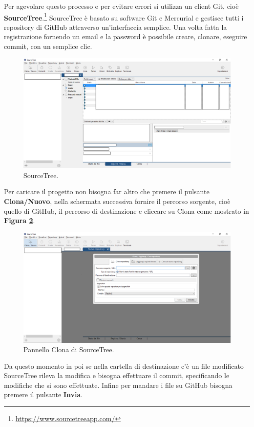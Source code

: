 \documentclass[a4paper,11pt]{article}
\begin{document}
Per agevolare questo processo e per evitare errori si utilizza un client Git, cioè \textbf{SourceTree}.\footnote{\url{https://www.sourcetreeapp.com/}}
SourceTree è basato su software Git e Mercurial e gestisce tutti i repository di GitHub attraverso un'interfaccia semplice.
Una volta fatta la registrazione fornendo un email e la password è 
possibile creare, clonare, eseguire commit, con un semplice clic.
\begin{figure}[!htpb]
	\centering
	\includegraphics[scale=0.30]{sourcetree.png}
	\caption{SourceTree.}
	\label{fig:14}
\end{figure}
Per caricare il progetto non bisogna far altro che premere il pulsante \textbf{Clona/Nuovo}, nella schermata successiva fornire il percorso sorgente, cioè quello di GitHub, il percorso di destinazione e cliccare su Clona come mostrato in \textbf{Figura \ref{fig:15}}.
\begin{figure}[!htpb]
	\centering
	\includegraphics[scale=0.30]{sourcetree2.png}
	\caption{Pannello Clona di SourceTree.}
	\label{fig:15}
\end{figure}\newpage
Da questo momento in poi se nella cartella di destinazione c'è un file modificato SourceTree rileva la modifica e bisogna effettuare il commit, specificando le modifiche che si sono effettuate. 
Infine per mandare i file su GitHub bisogna premere il pulsante \textbf{Invia}. 
\newpage
\end{document}
